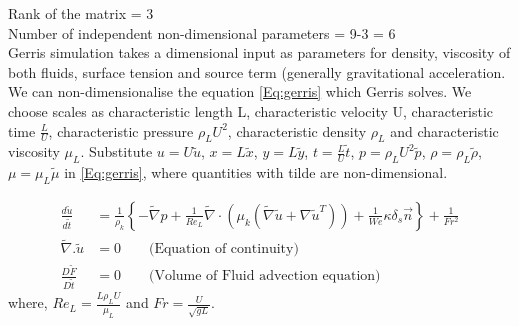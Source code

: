 Rank of the matrix = 3 \\

Number of independent non-dimensional parameters = 9-3 = 6 \\

Gerris simulation takes a dimensional input as parameters for density, viscosity of both fluids, surface tension and source term (generally gravitational acceleration. 
We can non-dimensionalise the equation \ref{Eq:gerris} which Gerris solves. We choose scales as characteristic length  L, characteristic velocity U,
characteristic time $\frac{L}{U}$, characteristic pressure $\rho_L U^2$, characteristic density $\rho_L$ and characteristic viscosity $\mu_L$.
Substitute $u = U\tilde u $, $x = L\tilde x $, $y = L\tilde y $, $t = \frac{L}{U}\tilde t $, $p = \rho_L U^2\tilde p $, $\rho = \rho_L \tilde\rho $, $\mu = \mu_L \tilde\mu $
in \ref{Eq:gerris}, where quantities with tilde are non-dimensional.

\begin{equation}
 \boxed {\begin{align}
 \frac{d \tilde u}{d\tilde t} &= \frac{1}{\rho_k} \left\{ - \tilde \nabla p + \frac{1}{Re_L}  \tilde \nabla \cdot ( \mu_k (\tilde \nabla \tilde u + \nabla \tilde u^T )) 
 + \frac{1}{We} \kappa \delta_s \overrightarrow n \right\} + \frac{1}{Fr^2} \\
 \tilde \nabla . \tilde u &= 0 \qquad\text{(Equation of continuity)}\\
 \frac{D\tilde F}{D\tilde t}&=0 \qquad\text{(Volume of Fluid advection equation)}
\end{align} }
\label{Eq:gerris_nd}
\end{equation}
where, $Re_L = \frac{L\rho_L U}{\mu_L}$ and $Fr = \frac{U}{\sqrt{gL}}$. \\

